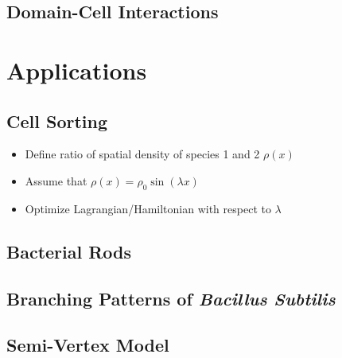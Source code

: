 \documentclass{article}
\begin{document}
\subsection{Domain-Cell Interactions}
\label{subsec:abstractions-domain-cell}

\section{Applications}
\label{section:applications}

\subsection{Cell Sorting}
\label{subsection:cell-sorting}

\begin{itemize}
    \item Define ratio of spatial density of species 1 and 2 $\rho(x)$
    \item Assume that $\rho(x) = \rho_0\sin(\lambda x)$
    \item Optimize Lagrangian/Hamiltonian with respect to $\lambda$
\end{itemize}

\subsection{Bacterial Rods}
\label{subsection:bacterial-rods}

\subsection{Branching Patterns of \textit{Bacillus Subtilis}}
\label{subsection:branching-patterns-of-bacillus-subtilis}

\subsection{Semi-Vertex Model}
\label{subsection:semi-vertex-model}



\end{document}
